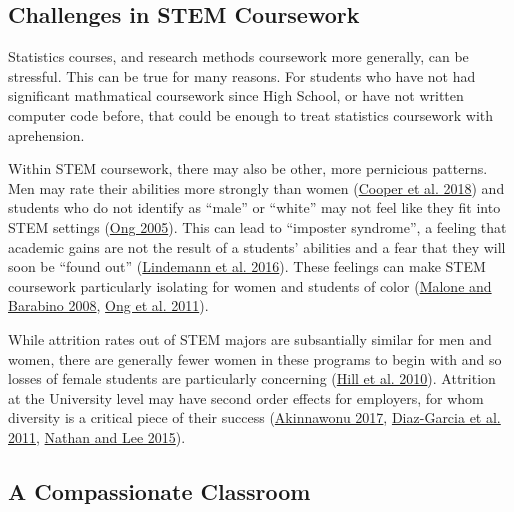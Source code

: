 \documentclass[]{book}
\theoremstyle{definition}
\theoremstyle{definition}
\theoremstyle{definition}
\theoremstyle{remark}
\begin{document}
\subsection{Challenges in STEM
Coursework}\label{challenges-in-stem-coursework}

Statistics courses, and research methods coursework more generally, can
be stressful. This can be true for many reasons. For students who have
not had significant mathmatical coursework since High School, or have
not written computer code before, that could be enough to treat
statistics coursework with aprehension.

Within STEM coursework, there may also be other, more pernicious
patterns. Men may rate their abilities more strongly than women
(\href{https://www.physiology.org/doi/10.1152/advan.00085.2017}{Cooper
et al. 2018}) and students who do not identify as ``male'' or ``white''
may not feel like they fit into STEM settings
(\href{https://doi.org/10.1525/sp.2005.52.4.593}{Ong 2005}). This can
lead to ``imposter syndrome'', a feeling that academic gains are not the
result of a students' abilities and a fear that they will soon be
``found out''
(\href{http://genderandset.open.ac.uk/index.php/genderandset/article/view/435}{Lindemann
et al. 2016}). These feelings can make STEM coursework particularly
isolating for women and students of color
(\href{https://onlinelibrary.wiley.com/doi/pdf/10.1002/sce.20307}{Malone
and Barabino 2008},
\href{https://doi.org/10.17763/haer.81.2.t022245n7x4752v2}{Ong et al.
2011}).

While attrition rates out of STEM majors are subsantially similar for
men and women, there are generally fewer women in these programs to
begin with and so losses of female students are particularly concerning
(\href{https://www.aauw.org/aauw_check/pdf_download/show_pdf.php?file=why-so-few-research}{Hill
et al. 2010}). Attrition at the University level may have second order
effects for employers, for whom diversity is a critical piece of their
success
(\href{https://open.nytimes.com/why-having-a-diverse-team-will-make-your-products-better-c73e7518f677}{Akinnawonu
2017},
\href{https://www.tandfonline.com/doi/abs/10.5172/impp.2013.15.2.149}{Diaz-Garcia
et al. 2011},
\href{https://www.tandfonline.com/doi/abs/10.1111/ecge.12016}{Nathan and
Lee 2015}).

\subsection{A Compassionate Classroom}\label{a-compassionate-classroom}
\end{document}
